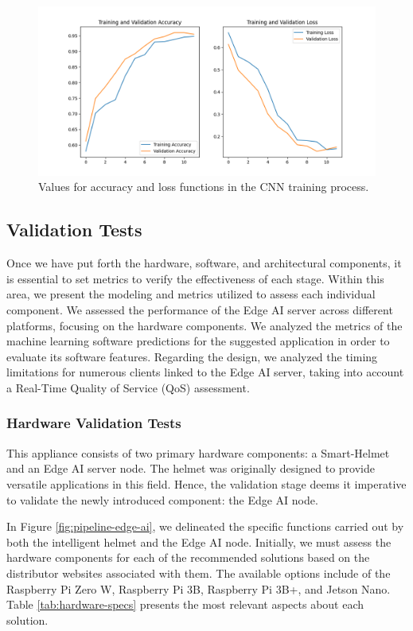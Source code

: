 \begin{figure}[h!]
    \centering
    \includegraphics[width=\linewidth]{Figures/cnn_train_validation.png}
    \caption{Values for accuracy and loss functions in the CNN training process.}
    \label{fig:cnn-train}
\end{figure}

\subsection{Validation Tests}

Once we have put forth the hardware, software, and architectural components, it is essential to set metrics to verify the effectiveness of each stage. Within this area, we present the modeling and metrics utilized to assess each individual component. We assessed the performance of the Edge AI server across different platforms, focusing on the hardware components. We analyzed the metrics of the machine learning software predictions for the suggested application in order to evaluate its software features. Regarding the design, we analyzed the timing limitations for numerous clients linked to the Edge AI server, taking into account a Real-Time Quality of Service (QoS) assessment.

\subsubsection{Hardware Validation Tests}

This appliance consists of two primary hardware components: a Smart-Helmet and an Edge AI server node. The helmet was originally designed to provide versatile applications in this field. Hence, the validation stage deems it imperative to validate the newly introduced component: the Edge AI node. 

In Figure \ref{fig:pipeline-edge-ai}, we delineated the specific functions carried out by both the intelligent helmet and the Edge AI node. Initially, we must assess the hardware components for each of the recommended solutions based on the distributor websites associated with them. The available options include of the Raspberry Pi Zero W, Raspberry Pi 3B, Raspberry Pi 3B+, and Jetson Nano. Table \ref{tab:hardware-specs} presents the most relevant aspects about each solution.

